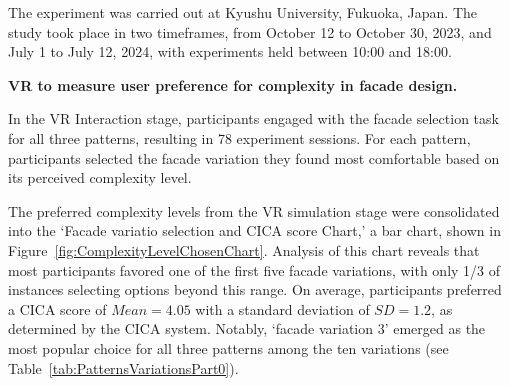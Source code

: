 
The experiment was carried out at Kyushu University, Fukuoka, Japan.
The study took place in two timeframes, from October 12 to October 30, 2023, and July 1 to July 12, 2024, with experiments held between 10:00 and 18:00.



\textbf{VR to measure user preference for complexity in facade design.}

In the VR Interaction stage, participants engaged with the facade selection task for all three patterns, resulting in 78 experiment sessions.
For each pattern, participants selected the facade variation they found most comfortable based on its perceived complexity level.


The preferred complexity levels from the VR simulation stage were consolidated into the `Facade variatio selection and CICA score Chart,' a bar chart, shown in Figure~\ref{fig:ComplexityLevelChosenChart}.
Analysis of this chart reveals that most participants favored one of the first five facade variations, with only 1/3 of instances selecting options beyond this range.
On average, participants preferred a CICA score of \(Mean = 4.05\) with a standard deviation of \(SD = 1.2\), as determined by the CICA system.
Notably, `facade variation 3'  emerged as the most popular choice for all three patterns among the ten variations (see Table~\ref{tab:PatternsVariationsPart0}).

